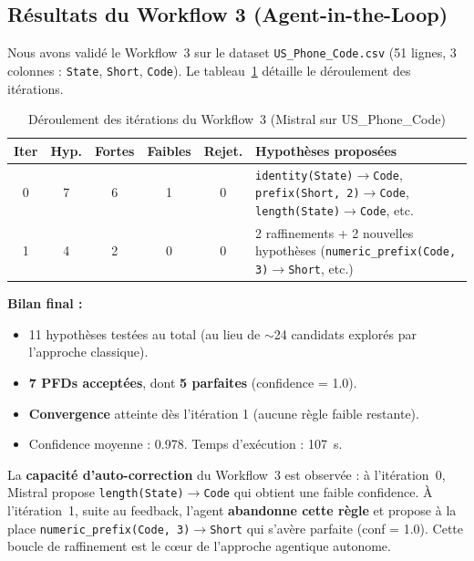 \documentclass[12pt,a4paper]{article}
\begin{document}
\subsection{R\'{e}sultats du Workflow 3 (Agent-in-the-Loop)}
\label{subsec:res-w3}

Nous avons valid\'{e} le Workflow~3 sur le dataset \texttt{US\_Phone\_Code.csv} (51 lignes, 3 colonnes : \texttt{State}, \texttt{Short}, \texttt{Code}). Le tableau~\ref{tab:w3-iter} d\'{e}taille le d\'{e}roulement des it\'{e}rations.

\begin{table}[H]
\centering
\caption{D\'{e}roulement des it\'{e}rations du Workflow~3 (Mistral sur US\_Phone\_Code)}
\label{tab:w3-iter}
\small
\begin{tabular}{@{}cccccp{5.5cm}@{}}
\toprule
\textbf{Iter} & \textbf{Hyp.} & \textbf{Fortes} & \textbf{Faibles} & \textbf{Rejet.} & \textbf{Hypoth\`{e}ses propos\'{e}es} \\
\midrule
0 & 7 & 6 & 1 & 0 & \texttt{identity(State)$\to$Code}, \texttt{prefix(Short, 2)$\to$Code}, \texttt{length(State)$\to$Code}, etc. \\
1 & 4 & 2 & 0 & 0 & 2 raffinements + 2 nouvelles hypoth\`{e}ses (\texttt{numeric\_prefix(Code, 3)$\to$Short}, etc.) \\
\bottomrule
\end{tabular}
\end{table}

\textbf{Bilan final :}
\begin{itemize}
    \item 11 hypoth\`{e}ses test\'{e}es au total (au lieu de $\sim$24 candidats explor\'{e}s par l'approche classique).
    \item \textbf{7 PFDs accept\'{e}es}, dont \textbf{5 parfaites} (confidence = 1.0).
    \item \textbf{Convergence} atteinte d\`{e}s l'it\'{e}ration 1 (aucune r\`{e}gle faible restante).
    \item Confidence moyenne : 0.978. Temps d'ex\'{e}cution : 107~s.
\end{itemize}

\begin{tcolorbox}[colback=red!5!white, colframe=red!50!black, title=Observation cl\'{e} sur W3]
La \textbf{capacit\'{e} d'auto-correction} du Workflow~3 est observ\'{e}e : \`{a} l'it\'{e}ration~0, Mistral propose \texttt{length(State)$\to$Code} qui obtient une faible confidence. \`{A} l'it\'{e}ration~1, suite au feedback, l'agent \textbf{abandonne cette r\`{e}gle} et propose \`{a} la place \texttt{numeric\_prefix(Code, 3)$\to$Short} qui s'av\`{e}re parfaite (conf = 1.0). Cette boucle de raffinement est le c\oe{}ur de l'approche agentique autonome.
\end{tcolorbox}
\end{document}
